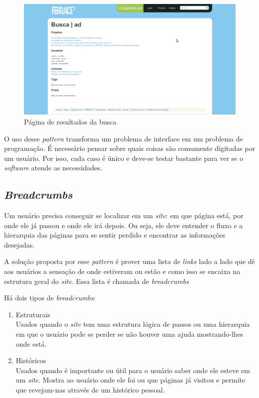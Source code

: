    \begin{figure}[h]
        \begin{center}
    \includegraphics[width=0.7\linewidth]{arquivos/forgiving_formats.png}
        \end{center}
        \caption{Página de resultados da busca}
        \label{forgiving_formats}
    \end{figure}

O uso desse \textit{pattern} transforma um problema de interface em um problema de programação. É necessário pensar sobre quais coisas são comumente digitadas por um usuário. Por isso, cada caso é único e deve-se testar bastante para ver se o \textit{software} atende as necessidades.

\subsection{\textit{Breadcrumbs}}

Um usuário precisa conseguir se localizar em um \textit{site}: em que página está, por onde ele já passou e onde ele irá depois. Ou seja, ele deve entender o fluxo e a hierarquia das páginas para se sentir perdido e encontrar as informações desejadas.

A solução proposta por esse \textit{pattern} é prover uma lista de \textit{links} lado a lado que dê aos usuários a sensação de onde estiveram ou estão e como isso se encaixa na estrutura geral do \textit{site}. Essa lista é chamada de \textit{breadcrumbs}

Há dois tipos de \textit{breadcrumbs}:

    \begin{enumerate}
        \item Estruturais \\
            Usados quando o \textit{site} tem uma estrutura lógica de passos ou uma hierarquia em que o usuário pode se perder se não houver uma ajuda mostrando-lhes onde está.
        \item Históricos \\
            Usados quando é importante ou útil para o usuário saber onde ele esteve em um \textit{site}. Mostra ao usuário onde ele foi ou que páginas já visitou e permite que revejam-nas através de um histórico pessoal.
    \end{enumerate}

